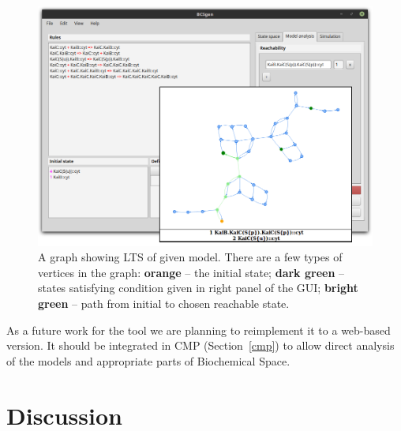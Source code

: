 \documentclass[12pt]{fithesis2}
\begin{document}
\begin{figure}[!h]
\begin{center}
\includegraphics[scale=0.35]{pics/BCSgen_reach}
\caption{A graph showing LTS of given model. There are a few types of vertices in the graph: \textbf{orange} -- the initial state; \textbf{dark green} -- states satisfying condition given in right panel of the GUI; \textbf{bright green} -- path from initial to chosen reachable state.}\label{gui_reach}
\end{center}
\end{figure}

\vspace*{-0.5cm}As a future work for the tool we are planning to reimplement it to a web-based version. It should be integrated in CMP (Section~\ref{cmp}) to allow direct analysis of the models and appropriate parts of Biochemical Space. 


\chapter{Discussion}



\end{document}
